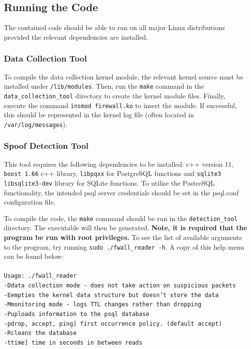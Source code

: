 \documentclass[12pt,twoside]{article}
\newcommand\tab[1][1cm]{\hspace*{#1}}
\begin{document}
\subsection{Running the Code}
The contained code should be able to run on all major Linux distributions provided the relevant dependencies are installed.

\subsubsection{Data Collection Tool}
To compile the data collection kernel module, the relevant kernel source must be installed under \texttt{/lib/modules}. Then, run the \texttt{make} command in the \texttt{data\_collection\_tool} directory to create the kernel module files. Finally, execute the command \texttt{insmod firewall.ko} to insert the module. If successful, this should be represented in the kernel log file (often located in \texttt{/var/log/messages}).

\subsubsection{Spoof Detection Tool}
This tool requires the following dependencies to be installed: c++ version 11, \texttt{boost 1.66} c++ library, \texttt{libpqxx} for PostgreSQL functions and \texttt{sqlite3 libsqlite3-dev} library for SQLite functions. To utilise the PostreSQL functionality, the intended psql server credentials should be set in the psql.conf configuration file.

To compile the code, the \texttt{make} command should be run in the \texttt{detection\_tool} directory. The executable will then be generated. \textbf{Note, it is required that the program be run with root privileges.} To see the list of available arguments to the program, try running \texttt{sudo ./fwall\_reader -h}. A copy of this help menu can be found below:\\\\
\texttt{Usage: ./fwall\_reader\\
\tab 	-D\tab data collection mode - does not take action on suspicious packets\\
\tab 	-E\tab 	empties the kernel data structure but doesn't store the data\\
\tab 	-M\tab 	monitoring mode - logs TTL changes rather than dropping\\
\tab 	-P\tab 	uploads information to the psql database\\
\tab 	-p\tab 	{[}drop, accept, ping{]} first occurrence policy. (default accept)\\
\tab 	-R\tab 	cleans the database\\
\tab	-t\tab 	{[}time{]} time in seconds in between reads\\
}
\end{document}

